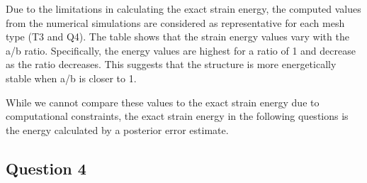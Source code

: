 \documentclass[twoside,twocolumn,10pt]{article}
\begin{document}
Due to the limitations in calculating the exact strain energy, the computed values from the numerical simulations are considered as representative for each mesh type (T3 and Q4). The table shows that the strain energy values vary with the a/b ratio. Specifically, the energy values are highest for a ratio of 1 and decrease as the ratio decreases. This suggests that the structure is more energetically stable when a/b is closer to 1. 

While we cannot compare these values to the exact strain energy due to computational constraints, the exact strain energy in the following questions is the energy calculated by a posterior error estimate.

\subsection{Question 4}
\end{document}
